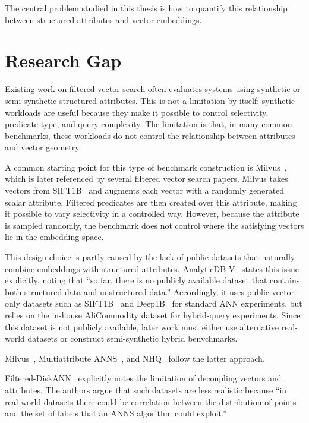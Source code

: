 The central problem studied in this thesis is how to quantify this relationship between structured attributes and vector embeddings.

\section{Research Gap}\label{sec:research-gap}

Existing work on filtered vector search often evaluates systems using synthetic or semi-synthetic structured attributes.
This is not a limitation by itself: synthetic workloads are useful because they make it possible to control selectivity, predicate type, and query complexity.
The limitation is that, in many common benchmarks, these workloads do not control the relationship between attributes and vector geometry.

A common starting point for this type of benchmark construction is Milvus~\cite{milvus}, which is later referenced by several filtered vector search papers.
Milvus takes vectors from SIFT1B~\cite{sift1b} and augments each vector with a randomly generated scalar attribute.
Filtered predicates are then created over this attribute, making it possible to vary selectivity in a controlled way.
However, because the attribute is sampled randomly, the benchmark does not control where the satisfying vectors lie in the embedding space.

This design choice is partly caused by the lack of public datasets that naturally combine embeddings with structured attributes.
AnalyticDB-V~\cite{analyticdbv} states this issue explicitly, noting that ``so far, there is no publicly available dataset that contains both structured data and unstructured data.''
Accordingly, it uses public vector-only datasets such as SIFT1B~\cite{sift1b} and Deep1B~\cite{deep1b} for standard ANN experiments, but relies on the in-house AliCommodity dataset for hybrid-query experiments.
Since this dataset is not publicly available, later work must either use alternative real-world datasets or construct semi-synthetic hybrid benvchmarks.

Milvus~\cite{milvus}, Multiattribute ANNS~\cite{multiattributenhq}, and NHQ~\cite{nhq} follow the latter approach.

Filtered-DiskANN~\cite{filtereddiskann} explicitly notes the limitation of decoupling vectors and attributes.
The authors argue that such datasets are less realistic because ``in real-world datasets there could be correlation between the distribution of points and the set of labels that an ANNS algorithm could exploit.''

